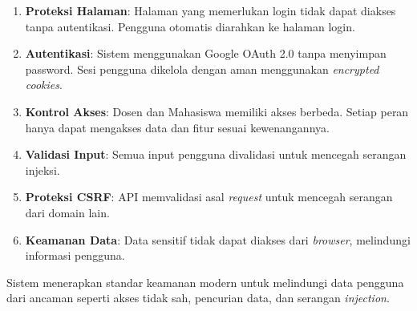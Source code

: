 \begin{enumerate}
	\item \textbf{Proteksi Halaman}: Halaman yang memerlukan login tidak dapat diakses tanpa autentikasi. Pengguna otomatis diarahkan ke halaman login.

	\item \textbf{Autentikasi}: Sistem menggunakan Google OAuth 2.0 tanpa menyimpan password. Sesi pengguna dikelola dengan aman menggunakan \textit{encrypted cookies}.

	\item \textbf{Kontrol Akses}: Dosen dan Mahasiswa memiliki akses berbeda. Setiap peran hanya dapat mengakses data dan fitur sesuai kewenangannya.

	\item \textbf{Validasi Input}: Semua input pengguna divalidasi untuk mencegah serangan injeksi.

	\item \textbf{Proteksi CSRF}: API memvalidasi asal \textit{request} untuk mencegah serangan dari domain lain.

	\item \textbf{Keamanan Data}: Data sensitif tidak dapat diakses dari \textit{browser}, melindungi informasi pengguna.
\end{enumerate}

Sistem menerapkan standar keamanan modern untuk melindungi data pengguna dari ancaman seperti akses tidak sah, pencurian data, dan serangan \textit{injection}.
